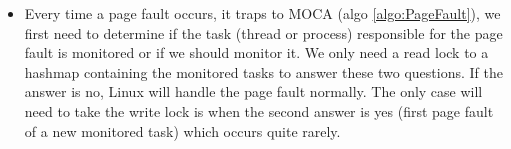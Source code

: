 \begin{itemize}
\begin{itemize}
                \begin{algorithm}[htb]
                    \caption{Page fault handler}
                    \label{algo:PageFault}
                    \begin{algorithmic}[1]
                        \State {}
                                \State {}
                                \State {}
                                \State \Return
                            \EndIf
                        \EndIf
                        \State {}
                        \State {}
                        \State {}
                        \State {}
                            \State {}
                        \EndIf
                        \State {}
                        \State {}
                    \end{algorithmic}
                \end{algorithm}

            \item Every time a page fault occurs, it traps to MOCA (algo
                \ref{algo:PageFault}), we first need to determine if the task
                (thread or process) responsible for the page fault is
                monitored or if we should monitor it. We only need a read lock
                to a hashmap containing the monitored tasks to answer these
                two questions. If the answer is no, Linux will handle the page
                fault normally. The only case will need to take the write lock
                is when the second answer is yes (first page fault of a new
                monitored task) which occurs quite rarely.


\end{itemize}
\end{itemize}
